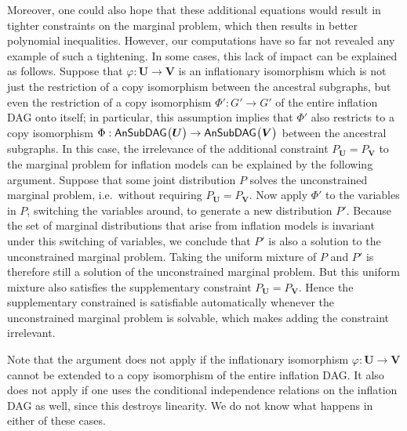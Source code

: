Moreover, one could also hope that these additional equations would result in tighter constraints on the marginal problem, which then results in better polynomial inequalities. However, our computations have so far not revealed any example of such a tightening. In some cases, this lack of impact can be explained as follows.
Suppose that $\varphi:\bm{U}\to\bm{V}$ is an inflationary isomorphism which is not just the restriction of a copy isomorphism between the ancestral subgraphs, but even the restriction of a copy isomorphism $\Phi':G'\to G'$ of the entire inflation DAG onto itself; in particular, this assumption implies that $\Phi'$ also restricts to a copy isomorphism $\Phi:{\operatorname{\mathsf{AnSubDAG}}_{}}\bigl\lparen\bm{U}\bigr\rparen\to{\operatorname{\mathsf{AnSubDAG}}_{}}\bigl\lparen\bm{V}\bigr\rparen$ between the ancestral subgraphs. In this case, the irrelevance of the additional constraint $P_{\bm{U}} = P_{\bm{V}}$ to the marginal problem for inflation models can be explained by the following argument. Suppose that some joint distribution $P$ solves the unconstrained marginal problem, i.e.~without requiring $P_{\bm{U}} = P_{\bm{V}}$. Now apply $\Phi'$ to the variables in $P$, switching the variables around, to generate a new distribution $P'$. Because the set of marginal distributions that arise from inflation models is invariant under this switching of variables, we conclude that $P'$ is also a solution to the unconstrained marginal problem. Taking the uniform mixture of $P$ and $P'$ is therefore still a solution of the unconstrained marginal problem. But this uniform mixture also satisfies the supplementary constraint $P_{\bm{U}} = P_{\bm{V}}$. Hence the supplementary constrained is satisfiable automatically whenever the unconstrained marginal problem is solvable, which makes adding the constraint irrelevant.

Note that the argument does not apply if the inflationary isomorphism $\varphi:\bm{U}\to\bm{V}$ cannot be extended to a copy isomorphism of the entire inflation DAG. It also does not apply if one uses the conditional independence relations on the inflation DAG as well, since this destroys linearity. We do not know what happens in either of these cases.





